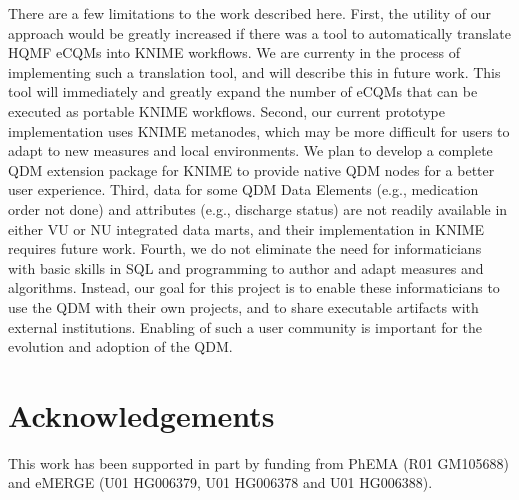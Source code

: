 \documentclass{article}
\begin{document}
There are a few limitations to the work described here. First, the utility of our approach would be greatly increased if there was a tool to automatically translate HQMF eCQMs into KNIME workflows. We are currenty in the process of implementing such a translation tool, and will describe this in future work. This tool will immediately and greatly expand the number of eCQMs that can be executed as portable KNIME workflows. Second, our current prototype implementation uses KNIME metanodes, which may be more difficult for users to adapt to new measures and local environments. We plan to develop a complete QDM extension package for KNIME to provide native QDM nodes for a better user experience. Third, data for some QDM Data Elements (e.g., medication order not done) and attributes (e.g., discharge status) are not readily available in either VU or NU integrated data marts, and their implementation in KNIME requires future work. Fourth, we do not eliminate the need for informaticians with basic skills in SQL and programming to author and adapt measures and algorithms. Instead, our goal for this project is to enable these informaticians to use the QDM with their own projects, and to share executable artifacts with external institutions. Enabling of such a user community is important for the evolution and adoption of the QDM.

\section{Acknowledgements}

This work has been supported in part by funding from PhEMA (R01 GM105688) and eMERGE (U01 HG006379, U01 HG006378 and U01 HG006388).

\centering


\end{document}
